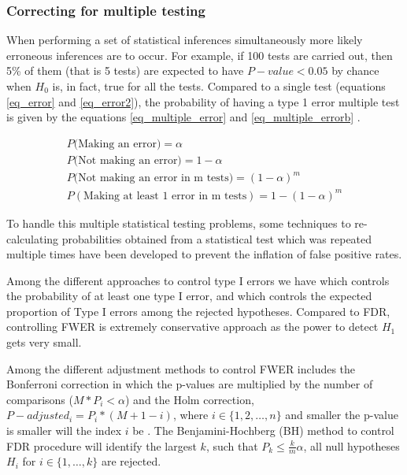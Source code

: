 \subsubsection{Correcting for multiple testing}

When performing  a set of statistical inferences simultaneously more likely erroneous inferences are to occur.
For example, if 100 tests are carried
out, then 5\% of them (that is 5 tests) are expected to
have $P-value < 0.05$ by chance when $H_0$ is, in fact, true for all the tests.
Compared to a single test (equations \ref{eq_error} and \ref{eq_error2}), the probability of having a type 1 error multiple test is given by the equations \ref{eq_multiple_error} and \ref{eq_multiple_errorb} \cite{vsidak1967rectangular}.

\begin{subequations}

\begin{align}
  P(\textrm{Making an error)} = \alpha \label{eq_error}\\
  P(\textrm{Not making an error)} = 1 - \alpha \label{eq_error2}\\
  P(\textrm{Not making an error in m tests)} = (1 - \alpha)^m  \label{eq_multiple_error}\\
  P(\textrm{Making at least 1 error in m tests}) = 1 - (1 - \alpha)^m  \label{eq_multiple_errorb}
\end{align}
\end{subequations}

To handle this multiple statistical testing problems,
some techniques  to re-calculating probabilities obtained from a statistical test which was repeated multiple times
have been developed to prevent the inflation of false positive rates.


Among the different approaches to control type I errors we have
 which controls the probability of at least one type I error,
and 
which controls the expected proportion of Type I errors
among the rejected hypotheses. Compared to FDR, controlling FWER is extremely conservative
approach as the power to detect $H_1$ gets very small.

Among the different adjustment methods to control FWER includes the Bonferroni correction
  in which the p-values are multiplied by the number of comparisons ($M * P_i < \alpha$) and the Holm correction, $P-adjusted_i = P_i * (M + 1 - i)$, where $i \in \{1,2,\dots,n\}$ and smaller the p-value is smaller will the index $i$ be \cite{aickin1996adjusting}.
 The Benjamini-Hochberg (BH) method to control FDR procedure will identify the largest $k$,
 such that $P_k \leq \frac{k}{m}\alpha$, all null hypotheses $H_i$ for $i \in \{1,\ldots,k\}$ are rejected.


